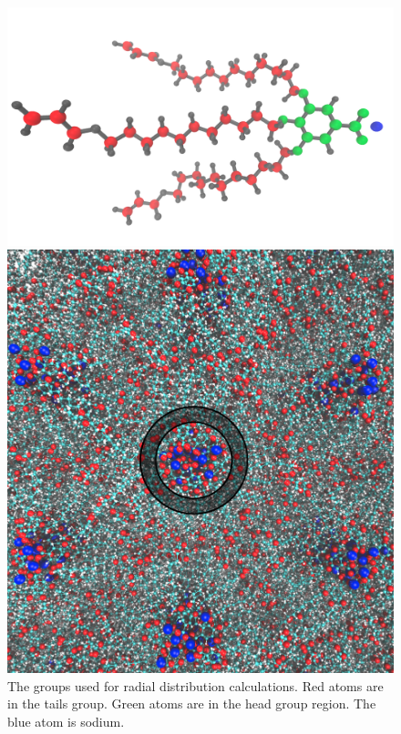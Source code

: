 \documentclass{article}
\begin{document}
  \begin{figure}
  \begin{minipage}{0.45\linewidth}
  \centering
  \includegraphics[width=\textwidth]{monomer_color_coded.png}
  \vspace{4.5em}
  \caption{The groups used for radial distribution calculations. Red atoms are in the
  tails group. Green atoms are in the head group region. The blue atom is sodium.}\label{fig:monomer_color_coded}
  \end{minipage}\qquad
  \begin{minipage}{0.45\textwidth}
  \centering
  \includegraphics[width=\linewidth]{radial_distribution_annulus.png}

\end{minipage}
\end{figure}
\end{document}
